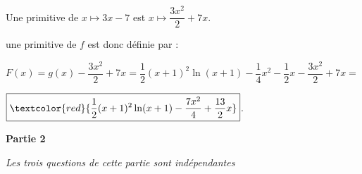 \documentclass[12pt]{article}
\begin{document}
Une primitive de $x\mapsto 3x-7$ est $x\mapsto \dfrac{3x^2}{2}+7x$.

\noindent une primitive de $f$ est donc définie par :

\noindent $F(x)=g(x)-\dfrac{3x^2}{2}+7x= \dfrac{1}{2}(x + 1)^2 \ln (x + 1) - \dfrac{1}{4}x^2 - \dfrac{1}{2}x-\dfrac{3x^2}{2}+7x=$

$\boxed{\textcolor{red}{\dfrac{1}{2}(x + 1)^2 \ln (x + 1) -\dfrac{7x^2}{4}+\dfrac{13}{2}x}}$.

\bigskip

\textbf{Partie 2}

\medskip

\emph{Les trois questions de cette partie sont indépendantes}

\medskip
\end{document}
